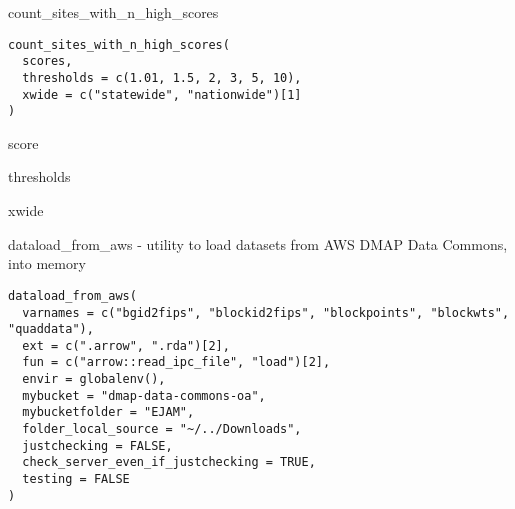 \documentclass[a4paper]{book}
\begin{document}
%
\begin{Description}\relax
count\_sites\_with\_n\_high\_scores
\end{Description}
%
\begin{Usage}
\begin{verbatim}
count_sites_with_n_high_scores(
  scores,
  thresholds = c(1.01, 1.5, 2, 3, 5, 10),
  xwide = c("statewide", "nationwide")[1]
)
\end{verbatim}
\end{Usage}
%
\begin{Arguments}
\begin{ldescription}
\item[\code{scores}] score

\item[\code{thresholds}] thresholds

\item[\code{xwide}] xwide
\end{ldescription}
\end{Arguments}
%
\begin{Description}\relax
dataload\_from\_aws - utility to load datasets from AWS DMAP Data Commons, into memory
\end{Description}
%
\begin{Usage}
\begin{verbatim}
dataload_from_aws(
  varnames = c("bgid2fips", "blockid2fips", "blockpoints", "blockwts", "quaddata"),
  ext = c(".arrow", ".rda")[2],
  fun = c("arrow::read_ipc_file", "load")[2],
  envir = globalenv(),
  mybucket = "dmap-data-commons-oa",
  mybucketfolder = "EJAM",
  folder_local_source = "~/../Downloads",
  justchecking = FALSE,
  check_server_even_if_justchecking = TRUE,
  testing = FALSE
)
\end{verbatim}
\end{Usage}
%
\end{document}
